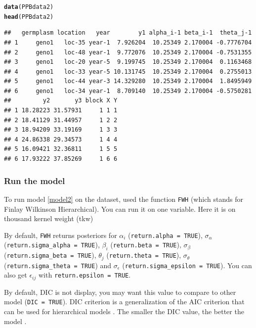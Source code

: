 \documentclass{article}\usepackage[]{graphicx}\usepackage[]{color}
\makeatletter
\newcommand{\hlstd}[1]{\textcolor[rgb]{0.345,0.345,0.345}{#1}}%
\newcommand{\hlkwd}[1]{\textcolor[rgb]{0.737,0.353,0.396}{\textbf{#1}}}%
\newenvironment{kframe}{%
 \def\at@end@of@kframe{}%
 \ifinner\ifhmode%
  \def\at@end@of@kframe{\end{minipage}}%
  \begin{minipage}{\columnwidth}%
 \fi\fi%
 \def\FrameCommand##1{\hskip\@totalleftmargin \hskip-\fboxsep
 \colorbox{shadecolor}{##1}\hskip-\fboxsep
     \hskip-\linewidth \hskip-\@totalleftmargin \hskip\columnwidth}%
 \MakeFramed {\advance\hsize-\width
   \@totalleftmargin\z@ \linewidth\hsize
   \@setminipage}}%
 {\par\unskip\endMakeFramed%
 \at@end@of@kframe}
\newenvironment{knitrout}{}{} %
\makeatother
\begin{document}
\begin{knitrout}
\color{fgcolor}\begin{kframe}
\begin{alltt}
\hlkwd{data}\hlstd{(PPBdata2)}
\hlkwd{head}\hlstd{(PPBdata2)}
\end{alltt}
\begin{verbatim}
##   germplasm location   year        y1 alpha_i-1 beta_i-1  theta_j-1
## 1     geno1   loc-35 year-1  7.926204  10.25349 2.170004 -0.7776704
## 2     geno1   loc-48 year-1  9.772076  10.25349 2.170004 -0.7531355
## 3     geno1   loc-20 year-5  9.199745  10.25349 2.170004  0.1163468
## 4     geno1   loc-33 year-5 10.131745  10.25349 2.170004  0.2755013
## 5     geno1   loc-44 year-3 14.329280  10.25349 2.170004  1.8495949
## 6     geno1   loc-34 year-1  8.709140  10.25349 2.170004 -0.5750281
##         y2       y3 block X Y
## 1 18.28223 31.57931     1 1 1
## 2 18.41129 31.44957     1 2 2
## 3 18.94209 33.19169     1 3 3
## 4 24.86338 29.34573     1 4 4
## 5 16.09421 32.36811     1 5 5
## 6 17.93222 37.85269     1 6 6
\end{verbatim}
\end{kframe}
\end{knitrout}


\subsubsection{Run the model}

To run model \ref{model2} on the dataset, used the function \texttt{FWH} (which stands for Finlay Wilkinson Hierarchical).
You can run it on one variable.
Here it is on thousand kernel weight (tkw)

By default, \texttt{FWH} returns posteriors for 
$\alpha_i$ (\texttt{return.alpha = TRUE}),
$\sigma_{\alpha}$ (\texttt{return.sigma\_alpha = TRUE}),
$\beta_i$ (\texttt{return.beta = TRUE}),
$\sigma_{\beta}$ (\texttt{return.sigma\_beta = TRUE}),
$\theta_j$ (\texttt{return.theta = TRUE}),
$\sigma_{\theta}$ (\texttt{return.sigma\_theta = TRUE}) and
$\sigma_{\epsilon}$ (\texttt{return.sigma\_epsilon = TRUE}).
You can also get $\epsilon_{ij}$ with \texttt{return.epsilon = TRUE}.

By default, DIC is not display, you may want this value to compare to other model (\texttt{DIC = TRUE}).
DIC criterion is a generalization of the AIC criterion that can be used for hierarchical models \citep{spiegelhalter_bayesian_2002}.
The smaller the DIC value, the better the model \citep{plummer_penalized_2008}.
\end{document}

